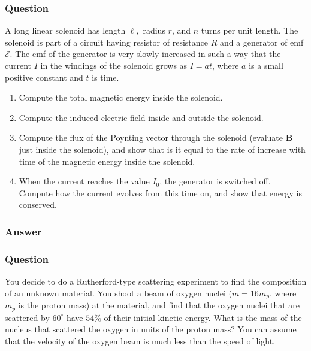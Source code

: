 \subsubsection{Question}
A long linear solenoid has length $\ell,$ radius $r$, and $n$ turns per unit length. The solenoid is part of a circuit having resistor of resistance $R$ and a generator of emf $\mathcal{E}$. The emf of the generator is very slowly increased in such a way that the current $I$ in the windings of the solenoid grows as $I=at$, where $a$ is a small positive constant and $t$ is time. 
\begin{enumerate}
	\item Compute the total magnetic energy inside the solenoid.
	\item Compute the induced electric field inside and outside the solenoid.
	\item Compute the flux of the Poynting vector through the solenoid (evaluate $\mathbf{B}$ just inside the solenoid), and show that is it equal to the rate of increase with time of the magnetic energy inside the solenoid.
	\item When the current reaches the value $I_0$, the generator is switched off. Compute how the current evolves from this time on, and show that energy is conserved. 
\end{enumerate}
\subsubsection{Answer}


\subsubsection{Question}
You decide to do a Rutherford-type scattering experiment to find the composition of an unknown material. You shoot a beam of oxygen nuclei ($m=16m_p$, where $m_p$ is the proton mass) at the material, and find that the oxygen nuclei that are scattered by $60^\circ$  have $54\%$ of their initial kinetic energy. What is the mass of the nucleus that scattered the oxygen in units of the proton mass? You can assume that the velocity of the oxygen beam is much less than the speed of light.
